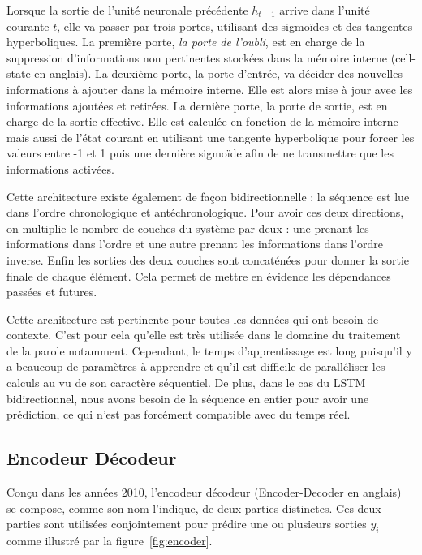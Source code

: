 Lorsque la sortie de l'unité neuronale précédente $h_{t-1}$ arrive dans l'unité courante $t$, elle va passer par trois portes, utilisant des sigmoïdes et des tangentes hyperboliques. La première porte, \textit{la porte de l'oubli}, est en charge de la suppression d'informations non pertinentes stockées dans la mémoire interne (cell-state en anglais). La deuxième porte, la porte d'entrée, va décider des nouvelles informations à ajouter dans la mémoire interne. Elle est alors mise à jour avec les informations ajoutées et retirées. La dernière porte, la porte de sortie, est en charge de la sortie effective. Elle est calculée en fonction de la mémoire interne mais aussi de l'état courant en utilisant une tangente hyperbolique pour forcer les valeurs entre -1 et 1 puis une dernière sigmoïde afin de ne transmettre que les informations activées.

Cette architecture existe également de façon bidirectionnelle : la séquence est lue dans l'ordre chronologique  et antéchronologique. Pour avoir ces deux directions, on multiplie le nombre de couches du système par deux : une prenant les informations dans l'ordre et une autre prenant les informations dans l'ordre inverse. Enfin les sorties des deux couches sont concaténées pour donner la sortie finale de chaque élément. Cela permet de mettre en évidence les dépendances passées et futures.

Cette architecture est pertinente pour toutes les données qui ont besoin de contexte. C'est pour cela qu'elle est très utilisée dans le domaine du traitement de la parole notamment. Cependant, le temps d'apprentissage est long puisqu'il y a beaucoup de paramètres à apprendre et qu'il est difficile de paralléliser les calculs au vu de son caractère séquentiel. De plus, dans le cas du LSTM bidirectionnel, nous avons besoin de la séquence en entier pour avoir une prédiction, ce qui n'est pas forcément compatible avec du temps réel.

\subsection{Encodeur Décodeur}


Conçu dans les années 2010, l'encodeur décodeur (Encoder-Decoder en anglais)~\cite{Cho2014} se compose, comme son nom l'indique, de deux parties distinctes. Ces deux parties sont utilisées conjointement pour prédire une ou plusieurs sorties $y_i$ comme illustré par la figure~\ref{fig:encoder}.

